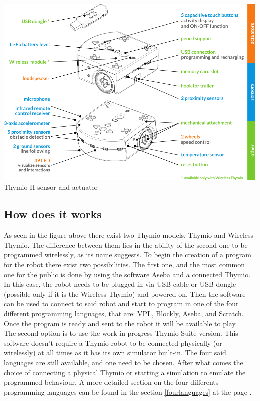 \documentclass{scrartcl}
\begin{document}
\begin{center}
  \includegraphics[width=\textwidth]{Wireless-thymioII-sensor-actuator-color-en}\\
  Thymio II sensor and actuator
\end{center}

\subsection{How does it works} \label{howdoesitworkref}

As seen in the figure above there exist two Thymio models, Thymio and Wireless Thymio. 
The difference between them lies in the ability of the second one to be programmed wirelessly, 
as its name suggests. To begin the creation of a program for the robot there exist two possibilities.
The first one, and the most common one for the public is done by using the software Aseba and a connected Thymio. 
In this case, the robot needs to be plugged in via USB cable or USB dongle (possible only if it is the Wireless Thymio) and powered on. 
Then the software can be used to connect to said robot and start to program in one of the four different programming languages, 
that are: VPL, Blockly, Aseba, and Scratch. Once the program is ready and sent to the robot it will be available to play. \\

The second option is to use the work-in-progress Thymio Suite version. 
This software doesn’t require a Thymio robot to be connected physically (or wirelessly) at all times as it has its own simulator built-in. 
The four said languages are still available, and one need to be chosen. 
After what comes the choice of connecting a physical Thymio or starting a simulation to emulate the programmed behaviour.
A more detailed section on the four differents programming languages can be found in the section \ref{fourlanguages} at the page \pageref{fourlanguages}.
\end{document}
